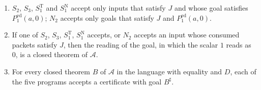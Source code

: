 \begin{proposition}\label{cert:prop:validated-terminal}
\begin{enumerate}[label=(\alph*)]
\item $S_2$, $S_3$, $S^{\mathrm T}_1$ and $S^{\mathrm N}_1$ accept only inputs that
satisfy $J$ and whose goal satisfies $P^{\mathrm{ed}}_{1}(a,0)$; $N_2$ accepts
only goals that satisfy $J$ and $P^{\mathrm{ed}}_{1}(a,0)$.
\item If one of $S_2$, $S_3$, $S^{\mathrm T}_1$, $S^{\mathrm N}_1$ accepts, or $N_2$
accepts an input whose consumed packets satisfy $J$, then the reading of the
goal, in which the scalar $1$ reads as $0$, is a closed theorem of $\mathcal A$.
\item For every closed theorem $B$ of $\mathcal A$ in the language with equality
and $D$, each of the five programs accepts a certificate with goal $B^{\sharp}$.
\end{enumerate}
\end{proposition}
